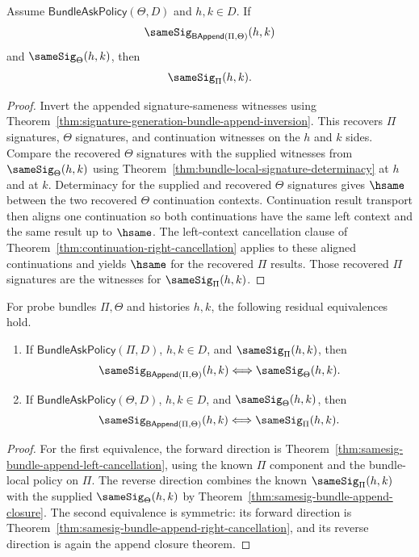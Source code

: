 \begin{theorem}
\label{thm:samesig-bundle-append-right-cancellation}
Assume $\mathsf{BundleAskPolicy}(\Theta,D)$ and $h,k\in D$. If
$$
\sameSig_{\mathsf{BAppend}(\Pi,\Theta)}(h,k)
$$
and $\sameSig_\Theta(h,k)$, then
$$
\sameSig_\Pi(h,k).
$$
\end{theorem}
\begin{proof}
Invert the appended signature-sameness witnesses using Theorem~\ref{thm:signature-generation-bundle-append-inversion}. This recovers $\Pi$ signatures, $\Theta$ signatures, and continuation witnesses on the $h$ and $k$ sides. Compare the recovered $\Theta$ signatures with the supplied witnesses from $\sameSig_\Theta(h,k)$ using Theorem~\ref{thm:bundle-local-signature-determinacy} at $h$ and at $k$. Determinacy for the supplied and recovered $\Theta$ signatures gives $\hsame$ between the two recovered $\Theta$ continuation contexts. Continuation result transport then aligns one continuation so both continuations have the same left context and the same result up to $\hsame$. The left-context cancellation clause of Theorem~\ref{thm:continuation-right-cancellation} applies to these aligned continuations and yields $\hsame$ for the recovered $\Pi$ results. Those recovered $\Pi$ signatures are the witnesses for $\sameSig_\Pi(h,k)$.
\end{proof}

\begin{theorem}
\label{thm:samesig-bundle-append-residual-iff}
For probe bundles $\Pi,\Theta$ and histories $h,k$, the following residual equivalences hold.
\begin{enumerate}
  \item If $\mathsf{BundleAskPolicy}(\Pi,D)$, $h,k\in D$, and $\sameSig_\Pi(h,k)$, then
  $$
  \sameSig_{\mathsf{BAppend}(\Pi,\Theta)}(h,k)\Longleftrightarrow\sameSig_\Theta(h,k).
  $$
  \item If $\mathsf{BundleAskPolicy}(\Theta,D)$, $h,k\in D$, and $\sameSig_\Theta(h,k)$, then
  $$
  \sameSig_{\mathsf{BAppend}(\Pi,\Theta)}(h,k)\Longleftrightarrow\sameSig_\Pi(h,k).
  $$
\end{enumerate}
\end{theorem}
\begin{proof}
For the first equivalence, the forward direction is Theorem~\ref{thm:samesig-bundle-append-left-cancellation}, using the known $\Pi$ component and the bundle-local policy on $\Pi$. The reverse direction combines the known $\sameSig_\Pi(h,k)$ with the supplied $\sameSig_\Theta(h,k)$ by Theorem~\ref{thm:samesig-bundle-append-closure}. The second equivalence is symmetric: its forward direction is Theorem~\ref{thm:samesig-bundle-append-right-cancellation}, and its reverse direction is again the append closure theorem.
\end{proof}

